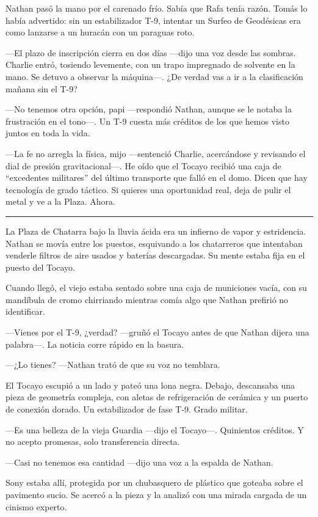 \documentclass[12pt,a4paper]{book}
\begin{document}
Nathan pasó la mano por el carenado frío. Sabía que Rafa tenía razón. Tomás lo había advertido: sin un estabilizador T-9, intentar un Surfeo de Geodésicas era como lanzarse a un huracán con un paraguas roto.

---El plazo de inscripción cierra en dos días ---dijo una voz desde las sombras. Charlie entró, tosiendo levemente, con un trapo impregnado de solvente en la mano. Se detuvo a observar la máquina---. ¿De verdad vas a ir a la clasificación mañana sin el T-9?

---No tenemos otra opción, papi ---respondió Nathan, aunque se le notaba la frustración en el tono---. Un T-9 cuesta más créditos de los que hemos visto juntos en toda la vida.

---La fe no arregla la física, mijo ---sentenció Charlie, acercándose y revisando el dial de presión gravitacional---. He oído que el Tocayo recibió una caja de ``excedentes militares'' del último transporte que falló en el domo. Dicen que hay tecnología de grado táctico. Si quieres una oportunidad real, deja de pulir el metal y ve a la Plaza. Ahora.

\bigskip
\noindent\rule{\textwidth}{0.4pt}
\bigskip

La Plaza de Chatarra bajo la lluvia ácida era un infierno de vapor y estridencia. Nathan se movía entre los puestos, esquivando a los chatarreros que intentaban venderle filtros de aire usados y baterías descargadas. Su mente estaba fija en el puesto del Tocayo.

Cuando llegó, el viejo estaba sentado sobre una caja de municiones vacía, con su mandíbula de cromo chirriando mientras comía algo que Nathan prefirió no identificar.

---Vienes por el T-9, ¿verdad? ---gruñó el Tocayo antes de que Nathan dijera una palabra---. La noticia corre rápido en la basura.

---¿Lo tienes? ---Nathan trató de que su voz no temblara.

El Tocayo escupió a un lado y pateó una lona negra. Debajo, descansaba una pieza de geometría compleja, con aletas de refrigeración de cerámica y un puerto de conexión dorado. Un estabilizador de fase T-9. Grado militar.

---Es una belleza de la vieja Guardia ---dijo el Tocayo---. Quinientos créditos. Y no acepto promesas, solo transferencia directa.

---Casi no tenemos esa cantidad ---dijo una voz a la espalda de Nathan.

Sony estaba allí, protegida por un chubasquero de plástico que goteaba sobre el pavimento sucio. Se acercó a la pieza y la analizó con una mirada cargada de un cinismo experto.
\end{document}
